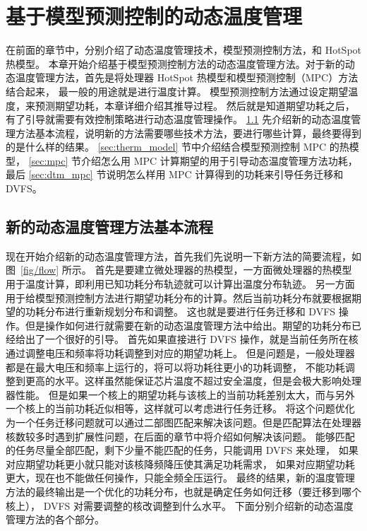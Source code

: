 
\chapter{基于模型预测控制的动态温度管理}

在前面的章节中，分别介绍了动态温度管理技术，模型预测控制方法，和 HotSpot 热模型。
本章开始介绍基于模型预测控制方法的动态温度管理方法。对于新的动态温度管理方法，首先是将处理器 HotSpot 热模型和模型预测控制（MPC）方法结合起来，
最一般的用途就是进行温度计算。
模型预测控制方法通过设定期望温度，来预测期望功耗，本章详细介绍其推导过程。
然后就是知道期望功耗之后，有了引导就需要有效控制策略进行动态温度管理操作。
 \ref{sec:new_overview} 先介绍新的动态温度管理方法基本流程，说明新的方法需要哪些技术方法，要进行哪些计算，最终要得到的是什么样的结果。
 \ref{sec:therm_model} 节中介绍结合模型预测控制 MPC 的热模型， \ref{sec:mpc} 节介绍怎么用 MPC 计算期望的用于引导动态温度管理方法功耗，最后 \ref{sec:dtm_mpc} 节说明怎么样用 MPC 计算得到的功耗来引导任务迁移和 DVFS。

 \section{新的动态温度管理方法基本流程}\label{sec:new_overview}
 
 现在开始介绍新的动态温度管理方法，首先我们先说明一下新方法的简要流程，如图~\ref{fig/flow} 所示。
 首先是要建立微处理器的热模型，一方面微处理器的热模型用于温度计算，即利用已知功耗分布轨迹就可以计算出温度分布轨迹。
 另一方面用于给模型预测控制方法进行期望功耗分布的计算。然后当前功耗分布就要根据期望的功耗分布进行重新规划分布和调整。
 这也就是要进行任务迁移和 DVFS 操作。但是操作如何进行就需要在新的动态温度管理方法中给出。期望的功耗分布已经给出了一个很好的引导。
 首先如果直接进行 DVFS 操作，就是当前任务所在核通过调整电压和频率将功耗调整到对应的期望功耗上。
 但是问题是，一般处理器都是在最大电压和频率上运行的，将可以将功耗往更小的功耗调整，
 不能功耗调整到更高的水平。这样虽然能保证芯片温度不超过安全温度，但是会极大影响处理器性能。
 但是如果一个核上的期望功耗与该核上的当前功耗差别太大，而与另外一个核上的当前功耗近似相等，这样就可以考虑进行任务迁移。
 将这个问题优化为一个任务迁移问题就可以通过二部图匹配来解决该问题。但是匹配算法在处理器核数较多时遇到扩展性问题，在后面的章节中将介绍如何解决该问题。
 能够匹配的任务尽量全部匹配，剩下少量不能匹配的任务，只能调用 DVFS 来处理， 如果对应期望功耗更小就只能对该核降频降压使其满足功耗需求，
 如果对应期望功耗更大，现在也不能做任何操作，只能全频全压运行。
 最终的结果，新的温度管理方法的最终输出是一个优化的功耗分布，也就是确定任务如何迁移（要迁移到哪个核上）， DVFS 对需要调整的核改调整到什么水平。
 下面分别介绍新的动态温度管理方法的各个部分。
 
